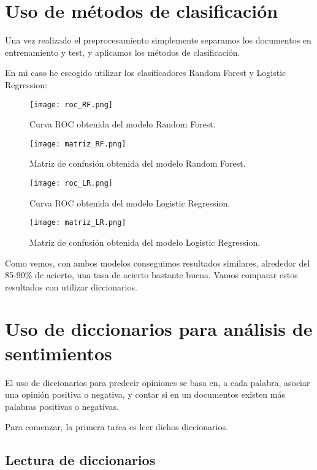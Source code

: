 \section{Uso de métodos de clasificación}

Una vez realizado el preprocesamiento simplemente separamos los documentos en entrenamiento y test, y aplicamos los métodos de clasificación.

En mi caso he escogido utilizar los clasificadores Random Forest y Logistic Regression:

\begin{figure}[H]
	\centering
	\texttt{[image: roc\_RF.png]}
	\caption{Curva ROC obtenida del modelo Random Forest.}
	\label{fig:roc_RF}
\end{figure}

\begin{figure}[H]
	\centering
	\texttt{[image: matriz\_RF.png]}
	\caption{Matriz de confusión obtenida del modelo Random Forest.}
	\label{fig:matriz_RF}
\end{figure}

\begin{figure}[H]
	\centering
	\texttt{[image: roc\_LR.png]}
	\caption{Curva ROC obtenida del modelo Logistic Regression.}
	\label{fig:roc_LR}
\end{figure}

\begin{figure}[H]
	\centering
	\texttt{[image: matriz\_LR.png]}
	\caption{Matriz de confusión obtenida del modelo Logistic Regression.}
	\label{fig:matriz_RL}
\end{figure}

Como vemos, con ambos modelos conseguimos resultados similares, alrededor del 85-90\% de acierto, una tasa de acierto bastante buena. Vamos comparar estos resultados con utilizar diccionarios.


\section{Uso de diccionarios para análisis de sentimientos}

El uso de diccionarios para predecir opiniones se basa en, a cada palabra, asociar una opinión positiva o negativa, y contar si en un documentos existen más palabras positivas o negativas.

Para comenzar, la primera tarea es leer dichos diccionarios.

\subsection{Lectura de diccionarios}

